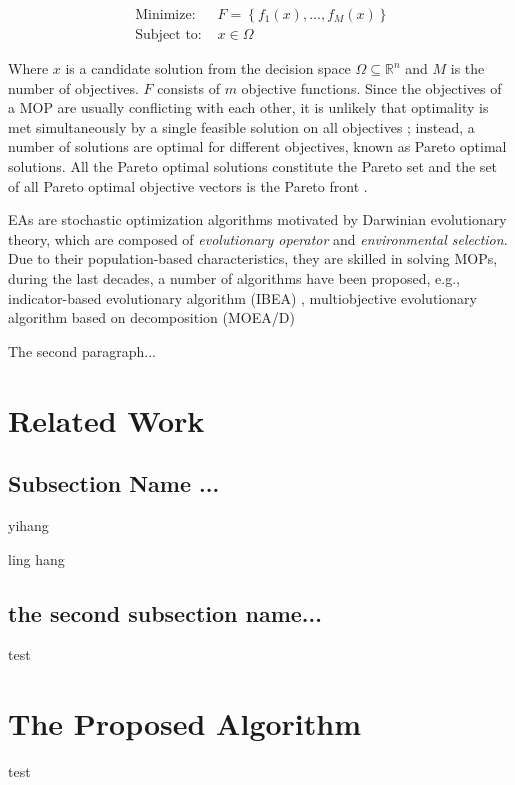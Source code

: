 \documentclass[journal]{IEEEtran}
\begin{document}
\begin{equation}
  \begin{array}{ll}
    \text { Minimize: }   & F=\left\{f_{1}(x), \ldots, f_{M}(x)\right\} \\
    \text { Subject to: } & x \in \Omega
  \end{array}
\end{equation}

Where $x$ is a candidate solution from the decision space $\Omega \subseteq \mathbb{R}^{n}$ and $M$ is the number of objectives. $F$ consists of $m$ objective functions. Since the objectives of a MOP are usually conflicting with each other, it is unlikely that optimality is met simultaneously by a single feasible solution on all objectives \cite{BAZGAN201341}; instead, a number of solutions are optimal for different objectives, known as Pareto optimal solutions. All the Pareto optimal solutions constitute the Pareto set and the set of all Pareto optimal objective vectors is the Pareto front \cite{deb2001multi}.

EAs are stochastic optimization algorithms motivated by Darwinian evolutionary theory, which are composed of \textit{evolutionary operator} and \textit{environmental selection}.
Due to their population-based characteristics, they are skilled in solving MOPs, during the last decades, a number of algorithms have been proposed, e.g., indicator-based evolutionary algorithm (IBEA) \cite{IBEA}, multiobjective evolutionary algorithm based on decomposition (MOEA/D)



\IEEEpubidadjcol

The second paragraph...
\section{Related Work}

\subsection{Subsection Name ... }
yihang

ling hang

\subsection{the second subsection name...}
test
\section{The Proposed Algorithm}
test
\end{document}
